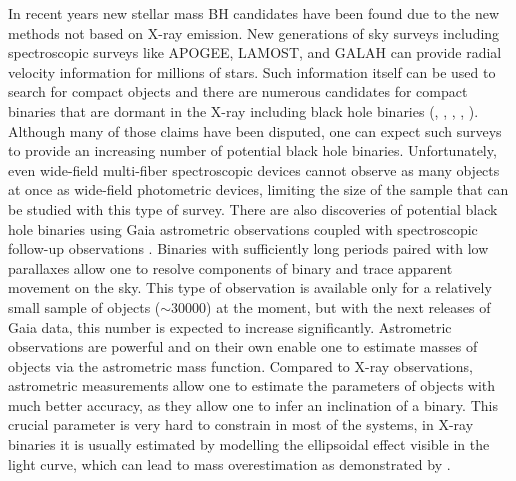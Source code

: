 \documentclass{pracalicmgr}
\begin{document}
In recent years new stellar mass BH candidates have been found due to the new methods not based on X-ray emission. New generations of sky surveys
including spectroscopic surveys like APOGEE, LAMOST, and GALAH can provide radial velocity information for millions of stars. Such
information itself can be used to search for compact objects and there are numerous candidates for compact binaries that are dormant in the
X-ray including black hole binaries (\citet{liu_wide_2019}, \citet{jayasinghe_asas-sn_2019}, \citet{shenar_x-ray-quiet_2022}, \citet{lennon_vlt-flames_2022},
\citet{thompson_noninteracting_2019}).
Although many of those claims have been disputed,
one can expect such surveys to provide an increasing number of potential black hole binaries. Unfortunately, even wide-field multi-fiber spectroscopic
devices cannot observe as many objects at once as wide-field photometric devices, limiting the size of the sample that can be studied with this type of
survey. There are also discoveries of potential black hole binaries using Gaia astrometric observations coupled with spectroscopic follow-up 
observations \citep{el-badry_sun-like_2022,el-badry_red_2023}.
Binaries with sufficiently long periods
paired with low parallaxes allow one to resolve components of binary and trace apparent movement on the sky.
This type of observation is available only for a relatively small sample of objects ($\sim 30000$) at the moment,
but with the next releases of Gaia data, this number is expected to increase significantly. Astrometric observations
are powerful and on their own enable one to estimate masses of objects via the astrometric mass function.
Compared to X-ray observations, astrometric measurements allow one to estimate the parameters of objects with much better accuracy, as they allow one to infer an inclination of a binary. 
This crucial parameter is very hard to constrain in most of the systems, in X-ray binaries it is usually estimated by modelling the ellipsoidal effect visible in the light curve,
which can lead to mass overestimation as demonstrated by \citep{kreidberg_mass_2012}. 
\end{document}
